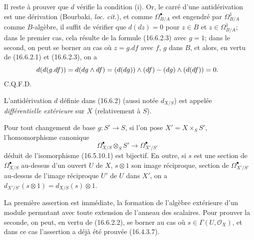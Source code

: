 Il reste à prouver que $d$ vérifie la condition (i). Or, le carré d'une
antidérivation est une dérivation (Bourbaki, \emph{loc. cit.}), et comme
$\Omega_{B/A}^{\bullet}$ est engendré par $\Omega_{B/A}^1$ comme
$B$-algèbre, il suffit de vérifier que $d(dz)=0$ pour $z\in B$ et
$z\in\Omega_{B/A}^1$; dans le premier cas, cela résulte de la formule
(16.6.2.3) avec $g=1$; dans le second, on peut se borner au cas où $z=g.df$
avec $f$, $g$ dans $B$, et alors, en vertu de (16.6.2.1) et (16.6.2.3), on a
\[
  d(d(g.df))=d(dg\wedge df)
  =(d(dg))\wedge(df)-(dg)\wedge(d(df))=0.
\]
\hfill C.Q.F.D.

\begin{definition}[16.6.3]
L'antidérivation $d$ définie dans \textup{(16.6.2)} (aussi notée $d_{X/S}$) est
appelée \emph{différentielle extérieure} sur $X$ (relativement à $S$).
\end{definition}

\begin{proposition}[16.6.4]
\label{IV.16.6.4}
Pour tout changement de base $g:S'\to S$, si l'on pose
$X'=X\times_S S'$, l'homomorphisme canonique
\[
  \varOmega_{X/S}^{\bullet}\otimes_S S'
  \longrightarrow\varOmega_{X'/S'}^{\bullet}
  \tag{16.6.4.1}
  \label{IV.16.6.4.1}
\]
déduit de l'isomorphisme \textup{(16.5.10.1)} est bijectif. En outre, si $s$ est une
section de $\varOmega_{X/S}^{\bullet}$ au-dessus d'un ouvert $U$ de $X$,
$s\otimes1$ son image réciproque, section de $\varOmega_{X'/S'}^{\bullet}$
au-dessus de l'image réciproque $U'$ de $U$ dans $X'$, on a
$d_{X'/S'}(s\otimes1)=d_{X/S}(s)\otimes1$.
\end{proposition}

La première assertion est immédiate, la formation de l'algèbre extérieure
d'un module permutant avec toute extension de l'anneau des scalaires. Pour
prouver la seconde, on peut, en vertu de (16.6.2.2), se borner au cas où
$s\in\Gamma(U,\mathcal{O}_X)$, et dans ce cas l'assertion a déjà été prouvée
(16.4.3.7).

